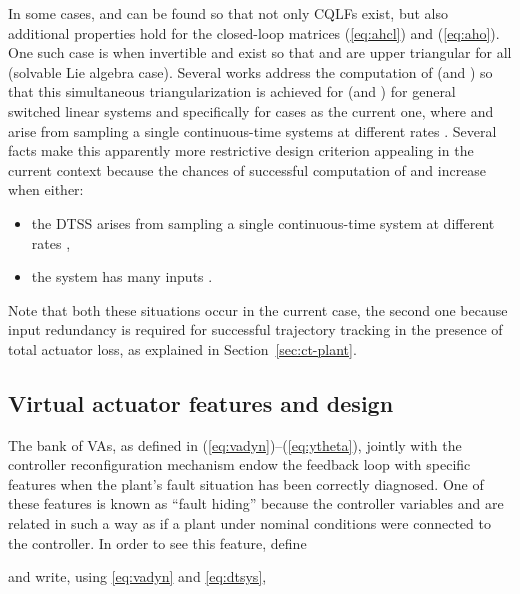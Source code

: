 \documentclass[letterpaper, 10 pt, conference]{ieeeconf}
\begin{document}
In some cases,  and  can be found so that not only CQLFs
exist, but also additional properties hold for the closed-loop
matrices (\ref{eq:ahcl}) and (\ref{eq:aho}). One such case is when
invertible  and  exist so that  and  are upper triangular for all
 (solvable Lie algebra case). Several works address the
computation of  (and ) so that this simultaneous
triangularization is achieved for  (and ) for
general switched linear systems
\cite{haibra_cdc09,haibra_tac10,haimobras_2010} and specifically for
cases as the current one, where  and  arise from sampling a
single continuous-time systems at different rates
\cite{haimo_ifac2011,osehaimo_rpic2011,haimoose_nahs12,osehaimo_aadeca2012}. Several
facts make this apparently more restrictive design criterion appealing
in the current context because the chances of successful computation
of  and  increase when either:
\begin{itemize}
\item the DTSS arises from sampling a single continuous-time system at
  different rates
  \cite{haimo_ifac2011,osehaimo_rpic2011,haimoose_nahs12,osehaimo_aadeca2012},
\item the system has many inputs \cite{haibra_aucc11,haibra_rpic11,HB_TAC2013}.
\end{itemize}
Note that both these situations occur in the current case, the second
one because input redundancy is required for successful trajectory
tracking in the presence of total actuator loss, as explained in
Section~\ref{sec:ct-plant}.









\subsection{Virtual actuator features and design}
\label{sec:va-design}

The bank of VAs, as defined in (\ref{eq:vadyn})--(\ref{eq:ytheta}),
jointly with the controller reconfiguration mechanism endow the
feedback loop with specific features when the plant's fault situation
has been correctly diagnosed. One of these features is known as
``fault hiding'' because the controller variables  and  are
related in such a way as if a plant under nominal conditions were
connected to the controller.  In order to see this feature, define

and write, using \eqref{eq:vadyn} and \eqref{eq:dtsys},
\end{document}
